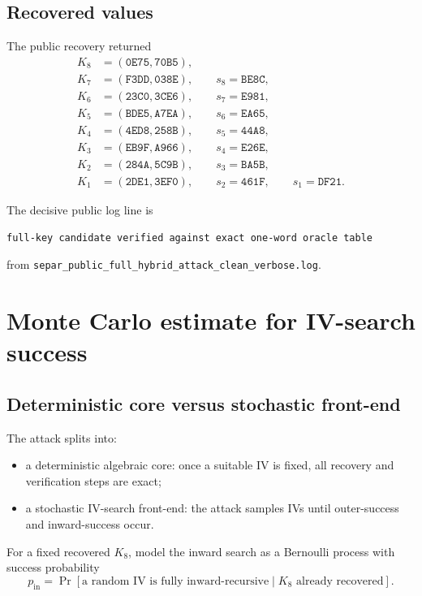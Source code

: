 \documentclass[11pt]{article}
\begin{document}
\subsection{Recovered values}
The public recovery returned
\begin{align*}
K_8 &= (\texttt{0E75},\texttt{70B5}),\\
K_7 &= (\texttt{F3DD},\texttt{038E}),\qquad s_8=\texttt{BE8C},\\
K_6 &= (\texttt{23C0},\texttt{3CE6}),\qquad s_7=\texttt{E981},\\
K_5 &= (\texttt{BDE5},\texttt{A7EA}),\qquad s_6=\texttt{EA65},\\
K_4 &= (\texttt{4ED8},\texttt{258B}),\qquad s_5=\texttt{44A8},\\
K_3 &= (\texttt{EB9F},\texttt{A966}),\qquad s_4=\texttt{E26E},\\
K_2 &= (\texttt{284A},\texttt{5C9B}),\qquad s_3=\texttt{BA5B},\\
K_1 &= (\texttt{2DE1},\texttt{3EF0}),\qquad s_2=\texttt{461F},\qquad s_1=\texttt{DF21}.
\end{align*}

The decisive public log line is
\begin{verbatim}
full-key candidate verified against exact one-word oracle table
\end{verbatim}
from \texttt{separ\_public\_full\_hybrid\_attack\_clean\_verbose.log}.

\section{Monte Carlo estimate for IV-search success}
\subsection{Deterministic core versus stochastic front-end}
The attack splits into:
\begin{itemize}[leftmargin=1.5em]
\item a deterministic algebraic core: once a suitable IV is fixed, all recovery and verification steps are exact;
\item a stochastic IV-search front-end: the attack samples IVs until outer-success and inward-success occur.
\end{itemize}

For a fixed recovered $K_8$, model the inward search as a Bernoulli process with success probability
\[
p_{\mathrm{in}}
=
\Pr[\text{a random IV is fully inward-recursive}\mid K_8 \text{ already recovered} ].
\]
\end{document}
